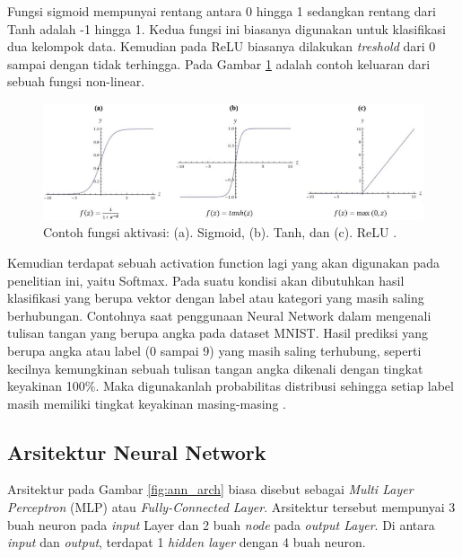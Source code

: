 Fungsi sigmoid mempunyai rentang antara 0 hingga 1 sedangkan rentang dari Tanh adalah -1 hingga 1. Kedua fungsi ini biasanya digunakan untuk klasifikasi dua kelompok data. Kemudian pada ReLU biasanya dilakukan \textit{treshold} dari 0 sampai dengan tidak terhingga. Pada Gambar \ref{fig:ann_non_linear} adalah contoh keluaran dari sebuah fungsi non-linear.
\vspace{1ex}

\begin{figure} [!h] \centering
	\includegraphics[scale=0.68]{img/ann_non_linear.png}
	\caption{Contoh fungsi aktivasi: (a). Sigmoid, (b). Tanh, dan (c). ReLU \citep{buduma2017}.}
	\label{fig:ann_non_linear}
\end{figure}

Kemudian terdapat sebuah activation function lagi yang akan digunakan pada penelitian ini, yaitu Softmax. Pada suatu kondisi akan dibutuhkan hasil klasifikasi yang berupa vektor dengan label atau kategori yang masih saling berhubungan. Contohnya saat penggunaan Neural Network dalam mengenali tulisan tangan yang berupa angka pada dataset MNIST. Hasil prediksi yang berupa angka atau label (0 sampai 9) yang masih saling terhubung, seperti kecilnya kemungkinan sebuah tulisan tangan angka dikenali dengan tingkat keyakinan 100\%. Maka digunakanlah probabilitas distribusi sehingga setiap label masih memiliki tingkat keyakinan masing-masing \citep{buduma2017}.
\vspace{1ex}

\subsection{Arsitektur Neural Network}
\label{sec:sub_sec2_nn_arch}

Arsitektur pada Gambar \ref{fig:ann_arch} biasa disebut sebagai \textit{Multi Layer Perceptron} (MLP) atau \textit{Fully-Connected Layer}. Arsitektur tersebut mempunyai 3 buah neuron pada \textit{input} Layer dan 2 buah \textit{node} pada \textit{output Layer}. Di antara \textit{input} dan \textit{output}, terdapat 1 \textit{hidden layer} dengan 4 buah neuron.
\vspace{1ex}

